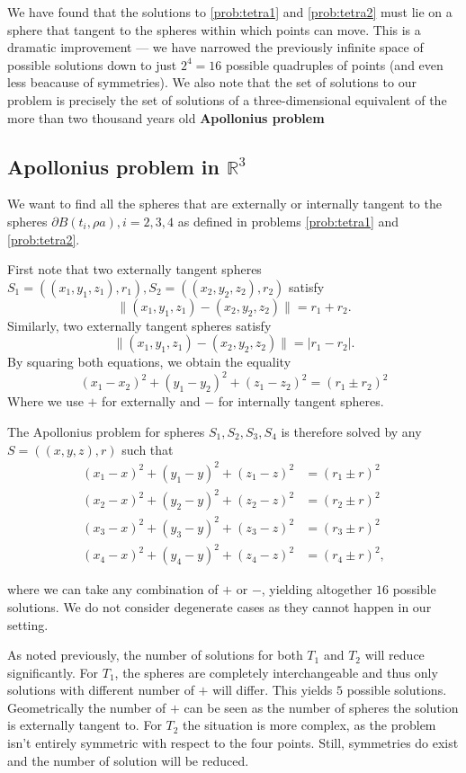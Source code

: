 We have found that the solutions to \ref{prob:tetra1} and \ref{prob:tetra2} must lie on a sphere that tangent to the spheres within which points can move. This is a dramatic improvement --- we have narrowed the previously infinite space of possible solutions down to just $2^4=16$ possible quadruples of points (and even less beacause of symmetries). We also note that the set of solutions to our problem is precisely the set of solutions of a three-dimensional equivalent of the more than two thousand years old  \textbf{Apollonius problem} 


\subsection{Apollonius problem in $\mathbb R^3$}
We want to find all the spheres that are externally or internally tangent to the spheres $\partial B(t_i,\rho a), i=2,3,4$ as defined in problems \ref{prob:tetra1} and \ref{prob:tetra2}.

First note that two externally tangent spheres $S_1=((x_1,y_1,z_1),r_1), S_2=((x_2,y_2,z_2),r_2)$  satisfy
$$\|(x_1,y_1,z_1) - (x_2,y_2,z_2)\| = r_1+r_2.$$
Similarly, two externally tangent spheres satisfy
$$\|(x_1,y_1,z_1) - (x_2,y_2,z_2)\| = |r_1 - r_2|.$$
By squaring both equations, we obtain the equality
$$(x_1-x_2)^2 + (y_1-y_2)^2 + (z_1-z_2)^2 = (r_1 \pm r_2)^2$$
Where we use $+$ for externally and $-$ for internally tangent spheres.

The Apollonius problem for spheres $S_1,S_2,S_3,S_4$ is therefore solved by any $S=((x,y,z),r)$ such that
\begin{align}\label{eq:Apollonius}
  (x_1-x)^2 + (y_1-y)^2 + (z_1-z)^2 &= (r_1 \pm r)^2 \\
  (x_2-x)^2 + (y_2-y)^2 + (z_2-z)^2 &= (r_2 \pm r)^2 \nonumber \\
  (x_3-x)^2 + (y_3-y)^2 + (z_3-z)^2 &= (r_3 \pm r)^2 \nonumber \\
  (x_4-x)^2 + (y_4-y)^2 + (z_4-z)^2 &= (r_4 \pm r)^2, \nonumber  
\end{align}

where we can take any combination of $+$ or $-$, yielding altogether $16$ possible solutions. We do not consider degenerate cases as they cannot happen in our setting. 

As noted previously, the number of solutions for both $T_1$ and $T_2$ will reduce significantly. For $T_1$, the spheres are completely interchangeable and thus only solutions with different number of $+$ will differ. This yields $5$ possible solutions. Geometrically the number of $+$ can be seen as the number of spheres the solution is externally tangent to. For $T_2$ the situation is more complex, as the problem isn't entirely symmetric with respect to the four points. Still, symmetries do exist and the number of solution will be reduced.  


